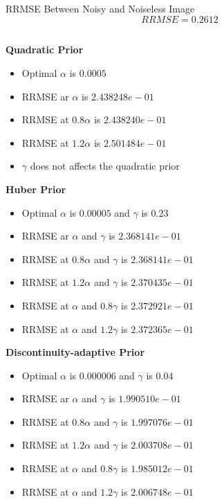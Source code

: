 \documentclass[11pt]{article}
\begin{document}
\maketitle

\subsection{}
RRMSE Between Noisy and Noiseless Image 
$$RRMSE = 0.2612$$

\subsection{}
\hfill \break
\textbf{Quadratic Prior}
\begin{itemize}
	\item Optimal $\alpha$ is $0.0005$
	\item RRMSE ar $\alpha$ is $2.438248e-01$
	\item RRMSE at $0.8\alpha$ is $2.438240e-01$
	\item RRMSE at $1.2\alpha$ is $2.501484e-01$
	\item $\gamma$ does not affects the quadratic prior
\end{itemize}

\hfill \break
\textbf{Huber Prior}
\begin{itemize}
	\item Optimal $\alpha$ is $ 0.00005 $ and $\gamma$ is $0.23$ 
	\item RRMSE ar $\alpha$ and $\gamma$ is $2.368141e-01$
	\item RRMSE at $0.8\alpha$ and $\gamma$ is $2.368141e-01$
	\item RRMSE at $1.2\alpha$ and $\gamma$ is $2.370435e-01$
	\item RRMSE at $\alpha$ and $0.8\gamma$ is $2.372921e-01$
	\item RRMSE at $\alpha$ and $1.2\gamma$ is $2.372365e-01$
\end{itemize}

\hfill \break
\textbf{Discontinuity-adaptive Prior}
\begin{itemize}
	\item Optimal $\alpha$ is $0.000006$ and $\gamma$ is $0.04$ 
	\item RRMSE ar $\alpha$ and $\gamma$ is $1.990510e-01$
	\item RRMSE at $0.8\alpha$ and $\gamma$ is $1.997076e-01$
	\item RRMSE at $1.2\alpha$ and $\gamma$ is $2.003708e-01$
	\item RRMSE at $\alpha$ and $0.8\gamma$ is $1.985012e-01$
	\item RRMSE at $\alpha$ and $1.2\gamma$ is $2.006748e-01$
\end{itemize}
\end{document}
